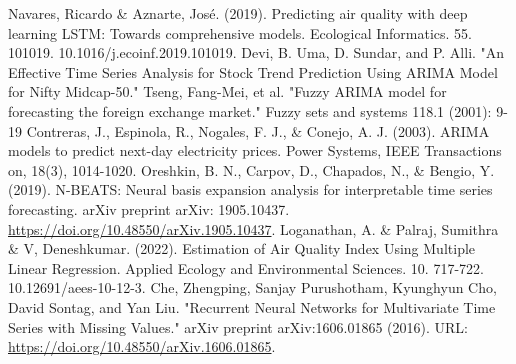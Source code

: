 \documentclass[conference]{IEEEtran}
\begin{document}
\begin{thebibliography}{00}
     Navares, Ricardo \& Aznarte, José. (2019). Predicting air quality with deep learning LSTM: Towards comprehensive models. Ecological Informatics. 55. 101019. 10.1016/j.ecoinf.2019.101019.
     Devi, B. Uma, D. Sundar, and P. Alli. "An Effective Time Series Analysis for Stock Trend Prediction Using ARIMA Model for Nifty Midcap-50."
     Tseng, Fang-Mei, et al. "Fuzzy ARIMA model for forecasting the foreign exchange market." Fuzzy sets and systems 118.1 (2001): 9-19
     Contreras, J., Espinola, R., Nogales, F. J., \& Conejo, A. J. (2003). ARIMA models to predict next-day electricity prices. Power Systems, IEEE Transactions on, 18(3), 1014-1020.
     Oreshkin, B. N., Carpov, D., Chapados, N., \& Bengio, Y. (2019). N-BEATS: Neural basis expansion analysis for interpretable time series forecasting. arXiv preprint arXiv: 1905.10437. \url{https://doi.org/10.48550/arXiv.1905.10437}.
     Loganathan, A. \& Palraj, Sumithra \& V, Deneshkumar. (2022). Estimation of Air Quality Index Using Multiple Linear Regression. Applied Ecology and Environmental Sciences. 10. 717-722. 10.12691/aees-10-12-3.
    Che, Zhengping, Sanjay Purushotham, Kyunghyun Cho, David Sontag, and Yan Liu.
    "Recurrent Neural Networks for Multivariate Time Series with Missing Values."
    arXiv preprint arXiv:1606.01865 (2016).
    URL: \url{https://doi.org/10.48550/arXiv.1606.01865}.
\end{thebibliography}
\end{document}
